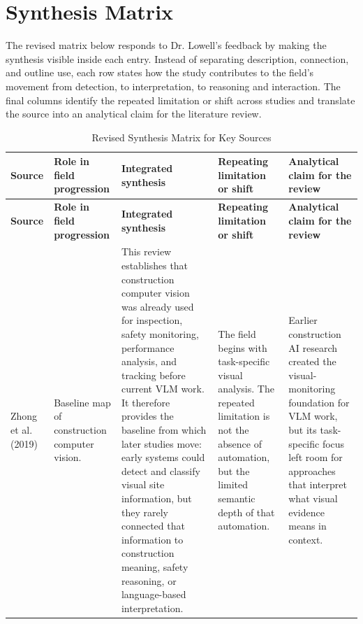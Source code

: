 \documentclass[10pt, letterpaper]{article}
\begin{document}
\section{Synthesis Matrix}

The revised matrix below responds to Dr. Lowell's feedback by making the synthesis visible inside each entry. Instead of separating description, connection, and outline use, each row states how the study contributes to the field's movement from detection, to interpretation, to reasoning and interaction. The final columns identify the repeated limitation or shift across studies and translate the source into an analytical claim for the literature review.

\begin{landscape}
\footnotesize
{}
\begin{longtable}{L{2.7cm} L{3.2cm} L{6.2cm} L{4.9cm} L{5.1cm}}
\caption{Revised Synthesis Matrix for Key Sources}\\
\toprule
{}
\textbf{Source} & \textbf{Role in field progression} & \textbf{Integrated synthesis} & \textbf{Repeating limitation or shift} & \textbf{Analytical claim for the review} \\
\midrule
\endfirsthead
\toprule
{}
\textbf{Source} & \textbf{Role in field progression} & \textbf{Integrated synthesis} & \textbf{Repeating limitation or shift} & \textbf{Analytical claim for the review} \\
\midrule
\endhead
\bottomrule
\endfoot

Zhong et al. (2019) & Baseline map of construction computer vision. & This review establishes that construction computer vision was already used for inspection, safety monitoring, performance analysis, and tracking before current VLM work. It therefore provides the baseline from which later studies move: early systems could detect and classify visual site information, but they rarely connected that information to construction meaning, safety reasoning, or language-based interpretation. & The field begins with task-specific visual analysis. The repeated limitation is not the absence of automation, but the limited semantic depth of that automation. & Earlier construction AI research created the visual-monitoring foundation for VLM work, but its task-specific focus left room for approaches that interpret what visual evidence means in context. \\


\end{longtable}
\end{landscape}
\end{document}
